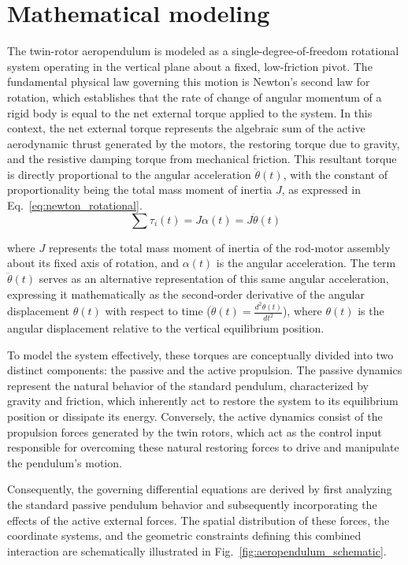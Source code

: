 \documentclass[pdflatex,sn-mathphys-num,iicol]{sn-jnl}
\theoremstyle{thmstyleone}%
\theoremstyle{thmstyletwo}%
\theoremstyle{thmstylethree}%
\begin{document}
\section{Mathematical modeling}\label{sec2}

The twin-rotor aeropendulum is modeled as a single-degree-of-freedom rotational system operating in the vertical plane about a fixed, low-friction pivot. The fundamental physical law governing this motion is Newton's second law for rotation, which establishes that the rate of change of angular momentum of a rigid body is equal to the net external torque applied to the system. In this context, the net external torque represents the algebraic sum of the active aerodynamic thrust generated by the motors, the restoring torque due to gravity, and the resistive damping torque from mechanical friction. This resultant torque is directly proportional to the angular acceleration $\ddot{\theta}(t)$, with the constant of proportionality being the total mass moment of inertia $J$, as expressed in Eq.~\ref{eq:newton_rotational}.
\begin{equation}
\sum \tau_i(t) = J \alpha(t) = J \ddot{\theta}(t)
\label{eq:newton_rotational}
\end{equation}

\noindent where $J$ represents the total mass moment of inertia of the rod-motor assembly about its fixed axis of rotation, and $\alpha(t)$ is the angular acceleration. The term $\ddot{\theta}(t)$ serves as an alternative representation of this same angular acceleration, expressing it mathematically as the second-order derivative of the angular displacement $\theta(t)$ with respect to time ($\ddot{\theta}(t) = \frac{d^2\theta(t)}{dt^2}$), where $\theta(t)$ is the angular displacement relative to the vertical equilibrium position. 

To model the system effectively, these torques are conceptually divided into two distinct components: the passive and the active propulsion. The passive dynamics represent the natural behavior of the standard pendulum, characterized by gravity and friction, which inherently act to restore the system to its equilibrium position or dissipate its energy. Conversely, the active dynamics consist of the propulsion forces generated by the twin rotors, which act as the control input responsible for overcoming these natural restoring forces to drive and manipulate the pendulum's motion.

Consequently, the governing differential equations are derived by first analyzing the standard passive pendulum behavior and subsequently incorporating the effects of the active external forces. The spatial distribution of these forces, the coordinate systems, and the geometric constraints defining this combined interaction are schematically illustrated in Fig.~\ref{fig:aeropendulum_schematic}.
\end{document}
